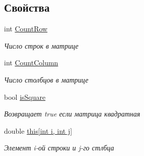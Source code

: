 \subsection*{Свойства}
\begin{DoxyCompactItemize}
\item 
int \hyperlink{class_b_l_a_s_1_1_matrix_a511a107843f7d488a87a7f01a184e893}{Count\+Row}
\begin{DoxyCompactList}\small\item\em Число строк в матрице \end{DoxyCompactList}\item 
int \hyperlink{class_b_l_a_s_1_1_matrix_aae67f388c0c049518adc10781e29d091}{Count\+Column}
\begin{DoxyCompactList}\small\item\em Число столбцов в матрице \end{DoxyCompactList}\item 
bool \hyperlink{class_b_l_a_s_1_1_matrix_aba7efc43be0d4d739b278d3c82d21935}{is\+Square}
\begin{DoxyCompactList}\small\item\em Возвращает true если матрица квадратная \end{DoxyCompactList}\item 
double \hyperlink{class_b_l_a_s_1_1_matrix_add823747419052a25f9a5cf67c8eeb03}{this\mbox{[}int i, int j\mbox{]}}
\begin{DoxyCompactList}\small\item\em Элемент i-\/ой строки и j-\/го стлбца \end{DoxyCompactList}\end{DoxyCompactItemize}
